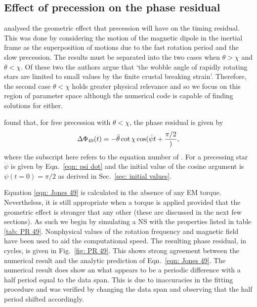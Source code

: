 \documentclass[../full_thesis/full_thesis.tex]{subfiles}
\begin{document}
\subsection{Effect of precession on the phase residual}

\citet{Jones2001} analysed the geometric effect that precession will have on
the timing residual. This was done by considering the motion of the magnetic
dipole in the inertial frame as the superposition of motions due to the fast
rotation period and the slow precession. The results must be separated into the
two cases when $\theta > \chi$ and $\theta < \chi$. Of these two the authors
argue that `the wobble angle  of rapidly rotating stars are limited to small
values by the finite crustal breaking strain'. Therefore, the second case
$\theta < \chi$ holds greater physical relevance and so we focus on this region
of parameter space although the numerical code is capable of finding solutions
for either.

\citet{Jones2001} found that, for free precession with $\theta < \chi$,
the phase residual is given by
\begin{equation}
    \Delta\Phi_{49}(t) = -\tilde{\theta} \cot\chi\cos(\dot{\psi}t + \frac{\pi/2}),
    \label{eqn: Jones 49}
\end{equation}
where the subscript here refers to the equation number of \citet{Jones2001}.
For a precessing star $\dot{\psi}$ is given by Eqn.~\eqref{eqn: psi dot} and
the initial value of the cosine argument is $\psi(t=0)=\pi/2$ as derived in
Sec.~\ref{sec: initial values}.

Equation \eqref{eqn: Jones 49} is calculated in the absence of any EM torque.
Nevertheless, it is still appropriate when a torque is applied provided
that the geometric effect is stronger that any other (these are discussed in
the next few sections). As such we begin by simulating a NS with the properties
listed in table \ref{tab: PR 49}. Nonphysical values of the
rotation frequency and magnetic field have been used to aid the computational
speed. The resulting phase residual, in cycles, is given in Fig.~\ref{fig:
PR 49}.
This shows strong agreement between the numerical result and the analytic
prediction of Eqn.~\eqref{eqn: Jones 49}. The numerical result does show an
what appears to be a periodic difference with a half period equal to the
data span. This is due to inaccuracies in the fitting procedure and was verified
by changing the data span and observing that the half period shifted accordingly.
\end{document}
